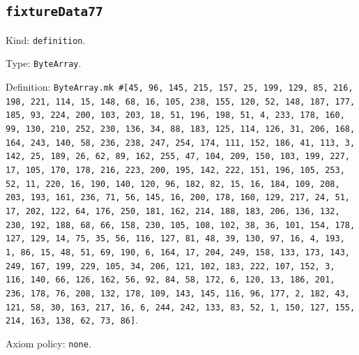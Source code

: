 \documentclass[11pt]{article}
\begin{document}
\subsection*{\texttt{fixtureData77}}
\noindent Kind: \texttt{definition}.\par
\noindent Type: \texttt{ByteArray}.\par
\noindent Definition: \texttt{ByteArray.mk \#[45, 96, 145, 215, 157, 25, 199, 129, 85, 216, 198, 221, 114, 15, 148, 68, 16, 105, 238, 155, 120, 52, 148, 187, 177, 185, 93, 224, 200, 103, 203, 18, 51, 196, 198, 51, 4, 233, 178, 160, 99, 130, 210, 252, 230, 136, 34, 88, 183, 125, 114, 126, 31, 206, 168, 164, 243, 140, 58, 236, 238, 247, 254, 174, 111, 152, 186, 41, 113, 3, 142, 25, 189, 26, 62, 89, 162, 255, 47, 104, 209, 150, 103, 199, 227, 17, 105, 170, 178, 216, 223, 200, 195, 142, 222, 151, 196, 105, 253, 52, 11, 220, 16, 190, 140, 120, 96, 182, 82, 15, 16, 184, 109, 208, 203, 193, 161, 236, 71, 56, 145, 16, 200, 178, 160, 129, 217, 24, 51, 17, 202, 122, 64, 176, 250, 181, 162, 214, 188, 183, 206, 136, 132, 230, 192, 188, 68, 66, 158, 230, 105, 108, 102, 38, 36, 101, 154, 178, 127, 129, 14, 75, 35, 56, 116, 127, 81, 48, 39, 130, 97, 16, 4, 193, 1, 86, 15, 48, 51, 69, 190, 6, 164, 17, 204, 249, 158, 133, 173, 143, 249, 167, 199, 229, 105, 34, 206, 121, 102, 183, 222, 107, 152, 3, 116, 140, 66, 126, 162, 56, 92, 84, 58, 172, 6, 120, 13, 186, 201, 236, 178, 76, 208, 132, 178, 109, 143, 145, 116, 96, 177, 2, 182, 43, 121, 58, 30, 163, 217, 16, 6, 244, 242, 133, 83, 52, 1, 150, 127, 155, 214, 163, 138, 62, 73, 86]}.\par
\noindent Axiom policy: \texttt{none}.\par
\end{document}
